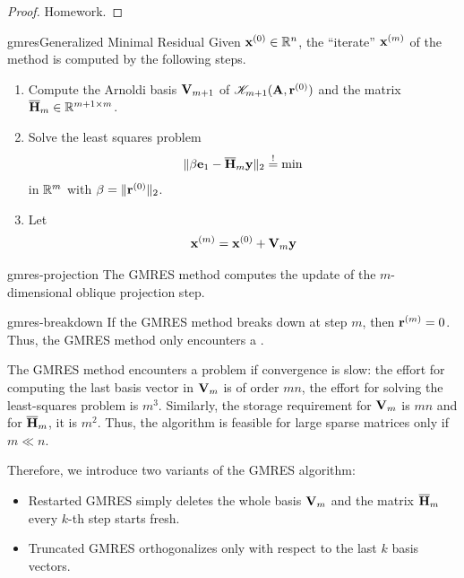 \begin{proof}
  Homework.
\end{proof}

\begin{Algorithm*}{gmres}{Generalized Minimal Residual}
  Given $\mathbf x^{(0)}\in\mathbb R^n$, the ``iterate'' $\mathbf x^{(m)}$ of the
   method is computed by the following steps.
  \begin{enumerate}
  \item Compute the Arnoldi basis $\mathbf V_{m+1}$ of
    $\mathscr K_{m+1}(\mathbf A,\mathbf r^{(0)})$ and the matrix $\overline{\mathbf H}_m\in\mathbb R^{m+1\times m}$.
  \item Solve the least squares problem
    \begin{gather}
      \lVert\beta\mathbf e_1 - \overline{\mathbf H}_m \mathbf y\rVert_2 \stackrel{!}{=} \min
    \end{gather}
    in $\mathbb R^m$ with $\beta = \lVert\mathbf r^{(0)}\rVert_2$.
  \item Let
    \begin{gather}
      \mathbf x^{(m)} = \mathbf x^{(0)} + \mathbf V_{m}\mathbf y
    \end{gather}
  \end{enumerate}
\end{Algorithm*}

\begin{Theorem}{gmres-projection}
  The GMRES method computes the update of the $m$-dimensional oblique
  projection step.
\end{Theorem}

\begin{Theorem}{gmres-breakdown}
  If the GMRES method breaks down at step $m$, then
  $\mathbf r^{(m)}=0$. Thus, the GMRES method only encounters a
  .
\end{Theorem}

\begin{remark}
  The GMRES method encounters a problem if convergence is slow: the
  effort for computing the last basis vector in $\mathbf V_m$ is of order
  $mn$, the effort for solving the least-squares problem is
  $m^3$. Similarly, the storage requirement for $\mathbf V_m$ is $mn$ and
  for $\overline {\mathbf H}_m$, it is $m^2$. Thus, the algorithm is
  feasible for large sparse matrices only if $m\ll n$.

  Therefore, we introduce two variants of the GMRES algorithm:
  \begin{itemize}
  \item Restarted GMRES simply deletes the whole basis $\mathbf V_m$ and the matrix $\overline{\mathbf H}_m$ every $k$-th step starts fresh.
  \item Truncated GMRES orthogonalizes only with respect to the last
    $k$ basis vectors.
  \end{itemize}
\end{remark}

